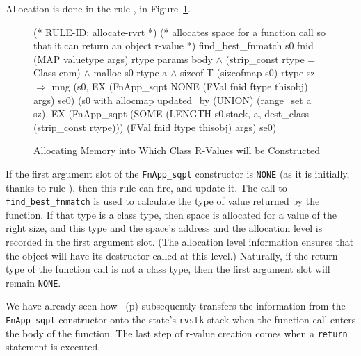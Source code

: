 \documentclass[11pt]{article}
\begin{document}
Allocation is done in the rule , in
Figure~\ref{fig:allocate-rvrt}.
\begin{figure}[hbtp]
\begin{stdrule}
(* RULE-ID: allocate-rvrt *)
(* allocates space for a function call so that it can return an
   object r-value *)
     find_best_fnmatch s0 fnid (MAP valuetype args)
                       rtype params body \(\land\)
     (strip_const rtype = Class cnm) \(\land\)
     malloc s0 rtype a \(\land\)
     sizeof T (sizeofmap s0) rtype sz
   \(\Rightarrow\)
     mng (s0, EX (FnApp_sqpt NONE
                             (FVal fnid ftype thisobj)
                             args)
                 se0)
         (s0 with allocmap updated_by (UNION) (range_set a sz),
          EX (FnApp_sqpt (SOME
                           (LENGTH s0.stack, a,
                            dest_class (strip_const rtype)))
                         (FVal fnid ftype thisobj)
                         args)
             se0)
\end{stdrule}
\caption[Allocating Memory for Class R-Values]{Allocating Memory into
  Which Class R-Values will be Constructed}
\label{fig:allocate-rvrt}
\end{figure}
If the first argument slot of the
\texttt{FnApp_sqpt} constructor
is \texttt{NONE} (as it is initially, thanks to rule
), then this rule can fire, and update it.
The call to \texttt{find_best_fnmatch} is used to calculate the type
of value returned by the function.  If that type is a class type, then
space is allocated for a value of the right size, and this type and
the space's address and the allocation level is recorded in the first
argument slot.  (The allocation level information ensures that the
object will have its destructor called at this level.) Naturally, if
the return type of the function call is not a class type, then the
first argument slot will remain \texttt{NONE}.

We have already seen how
~(p\pageref{fig:function-call}) subsequently
transfers the information from the \texttt{FnApp_sqpt} constructor
onto the state's \texttt{rvstk} stack %
%
when the function call enters the body of the function.  The last step
of r-value creation comes when a \texttt{return} statement is
executed.
\end{document}
